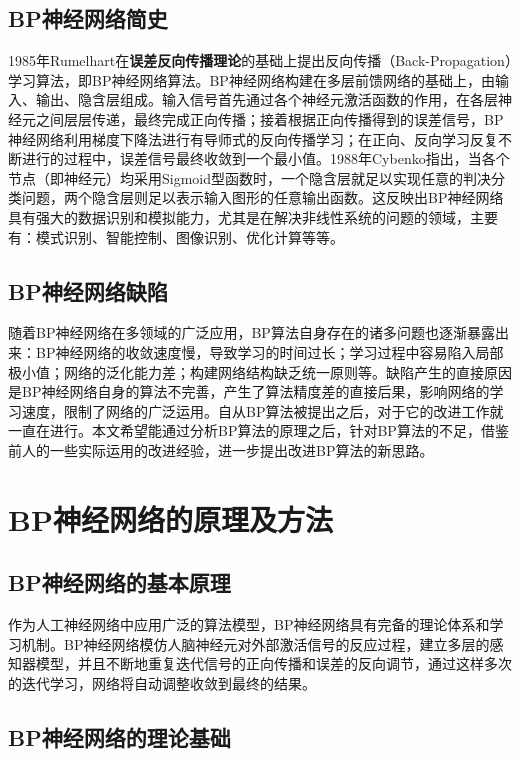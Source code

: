 \documentclass[UTF8]{ctexart}
\begin{document}
\subsection{BP神经网络简史}
1985年Rumelhart在\textbf{误差反向传播理论}的基础上提出反向传播（Back-Propagation）学习算法，即BP神经网络算法。BP神经网络构建在多层前馈网络的基础上，由输入、输出、隐含层组成。输入信号首先通过各个神经元激活函数的作用，在各层神经元之间层层传递，最终完成正向传播；接着根据正向传播得到的误差信号，BP神经网络利用梯度下降法进行有导师式的反向传播学习；在正向、反向学习反复不断进行的过程中，误差信号最终收敛到一个最小值。1988年Cybenko指出，当各个节点（即神经元）均采用Sigmoid型函数时，一个隐含层就足以实现任意的判决分类问题，两个隐含层则足以表示输入图形的任意输出函数。这反映出BP神经网络具有强大的数据识别和模拟能力，尤其是在解决非线性系统的问题的领域，主要有：模式识别、智能控制、图像识别、优化计算等等。 \par
\subsection{BP神经网络缺陷}
随着BP神经网络在多领域的广泛应用，BP算法自身存在的诸多问题也逐渐暴露出来：BP神经网络的收敛速度慢，导致学习的时间过长；学习过程中容易陷入局部极小值；网络的泛化能力差；构建网络结构缺乏统一原则等。缺陷产生的直接原因是BP神经网络自身的算法不完善，产生了算法精度差的直接后果，影响网络的学习速度，限制了网络的广泛运用。自从BP算法被提出之后，对于它的改进工作就一直在进行。本文希望能通过分析BP算法的原理之后，针对BP算法的不足，借鉴前人的一些实际运用的改进经验，进一步提出改进BP算法的新思路。

\section{BP神经网络的原理及方法}

\subsection{BP神经网络的基本原理}

作为人工神经网络中应用广泛的算法模型，BP神经网络具有完备的理论体系和学习机制。BP神经网络模仿人脑神经元对外部激活信号的反应过程，建立多层的感知器模型，并且不断地重复迭代信号的正向传播和误差的反向调节，通过这样多次的迭代学习，网络将自动调整收敛到最终的结果。

\subsection{BP神经网络的理论基础}
\end{document}
